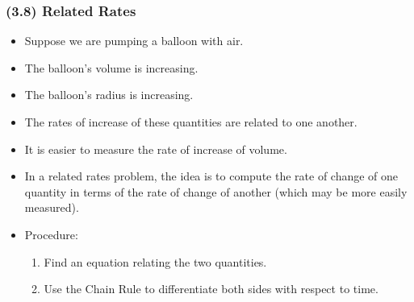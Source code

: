 \begin{frame}
\frametitle{(3.8)  Related Rates}
\begin{itemize}
\item  Suppose we are pumping a balloon with air.
\item  The balloon's volume is increasing.
\item  The balloon's radius is increasing.
\item  The rates of increase of these quantities are related to one another.
\item<2->  It is easier to measure the rate of increase of volume.
\item<3->  In a related rates problem, the idea is to compute the rate of change of one quantity in terms of the rate of change of another (which may be more easily measured).
\item<4->  Procedure:
\begin{enumerate}
\item<4->  Find an equation relating the two quantities.
\item<4->  Use the Chain Rule to differentiate both sides with respect to time.
\end{enumerate}
\end{itemize}
\end{frame}
